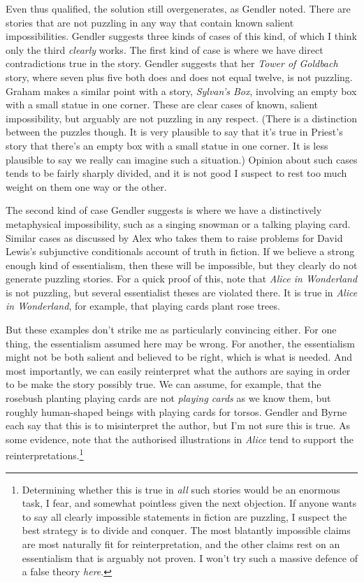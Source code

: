 Even thus qualified, the solution still overgenerates, as Gendler noted. There are stories that are not puzzling in any way that contain known salient impossibilities. Gendler suggests three kinds of cases of this kind, of which I think only the third \textit{clearly }works. The first kind of case is where we have direct contradictions true in the story. Gendler suggests that her \textit{Tower of Goldbach} story, where seven plus five both does and does not equal twelve, is not puzzling. Graham \citet{Priest1999} makes a similar point with a story, \textit{Sylvan's Box}, involving an empty box with a small statue in one corner. These are clear cases of known, salient impossibility, but arguably are not puzzling in any respect. (There is a distinction between the puzzles though. It is very plausible to say that it's true in Priest's story that there's an empty box with a small statue in one corner. It is less plausible to say we really can imagine such a situation.) Opinion about such cases tends to be fairly sharply divided, and it is not good I suspect to rest too much weight on them one way or the other.

The second kind of case Gendler suggests is where we have a distinctively metaphysical impossibility, such as a singing snowman or a talking playing card. Similar cases as discussed by Alex \citet{Byrne1993} who takes them to raise problems for David Lewis's \citeyearpar{Lewis1978b} subjunctive conditionals account of truth in fiction. If we believe a strong enough kind of essentialism, then these will be impossible, but they clearly do not generate puzzling stories. For a quick proof of this, note that \textit{Alice in Wonderland} is not puzzling, but several essentialist theses are violated there. It is true in \textit{Alice in Wonderland}, for example, that playing cards plant rose trees.

But these examples don't strike me as particularly convincing either. For one thing, the essentialism assumed here may be wrong. For another, the essentialism might not be both salient and believed to be right, which is what is needed. And most importantly, we can easily reinterpret what the authors are saying in order to be make the story possibly true. We can assume, for example, that the rosebush planting playing cards are not \textit{playing cards }as we know them, but roughly human-shaped beings with playing cards for torsos. Gendler and Byrne each say that this is to misinterpret the author, but I'm not sure this is true. As some evidence, note that the authorised illustrations in \textit{Alice} tend to support the reinterpretations.\footnote{Determining whether this is true in \textit{all} such stories would be an enormous task, I fear, and somewhat pointless given the next objection. If anyone wants to say all clearly impossible statements in fiction are puzzling, I suspect the best strategy is to divide and conquer. The most blatantly impossible claims are most naturally fit for reinterpretation, and the other claims rest on an essentialism that is arguably not proven. I won't try such a massive defence of a false theory \textit{here}.} 

